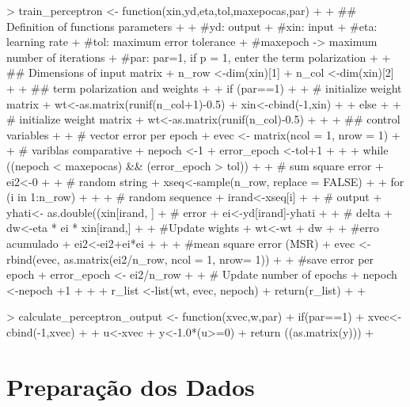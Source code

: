 \documentclass[12pt]{article}
\begin{document}
\begin{Schunk}
\begin{Sinput}
> train_perceptron <- function(xin,yd,eta,tol,maxepocas,par){
+   
+   ## Definition of  functions parameters 
+   
+   #yd: output
+   #xin: input 
+   #eta: learning rate
+   #tol: maximum error tolerance
+   #maxepoch -> maximum number of iterations
+   #par: par=1, if p = 1, enter the term polarization
+   
+   ## Dimensions of input matrix
+   n_row <-dim(xin)[1]
+   n_col <-dim(xin)[2] 
+   
+   ## term polarization and weights 
+   
+   if (par==1){
+     
+     # initialize weight matrix
+     wt<-as.matrix(runif(n_col+1)-0.5) 
+     xin<-cbind(-1,xin)
+   }
+   else{
+     
+     # initialize weight matrix
+     wt<-as.matrix(runif(n_col)-0.5)
+   }
+   
+   ## control variables 
+   
+   # vector error per epoch
+   evec <- matrix(ncol = 1, nrow = 1)
+   
+   # variblas comparative  
+   nepoch <-1
+   error_epoch <-tol+1
+   
+   
+   while ((nepoch < maxepocas) && (error_epoch > tol))
+   {
+     # sum square error
+     ei2<-0
+     
+     # random string
+     xseq<-sample(n_row, replace = FALSE)
+     
+     for (i in 1:n_row)
+     {
+       
+       # random sequence
+       irand<-xseq[i]
+       
+       # output 
+       yhati<- as.double((xin[irand, ] %*% wt) >= 0)
+       # error 
+       ei<-yd[irand]-yhati
+       
+       # delta 
+       dw<-eta * ei * xin[irand,] 
+       
+       #Update wights 
+       wt<-wt + dw
+       
+       #erro acumulado
+       ei2<-ei2+ei*ei
+     }
+     
+     #mean square error (MSR)
+     evec <- rbind(evec, as.matrix(ei2/n_row, ncol = 1, nrow= 1))
+     
+     #save error per epoch
+     error_epoch <- ei2/n_row
+     
+     # Update number of epochs 
+     nepoch <-nepoch +1
+   }
+   
+   r_list <-list(wt, evec, nepoch)
+   return(r_list)
+   
+ } 
\end{Sinput}
\end{Schunk}

\begin{Schunk}
\begin{Sinput}
>   calculate_perceptron_output <- function(xvec,w,par){
+   if(par==1){
+       xvec<-cbind(-1,xvec)}
+   
+   u<-xvec %*% w
+   y<-1.0*(u>=0)
+   return ((as.matrix(y))) 
+ }
\end{Sinput}
\end{Schunk}

\section{Preparação dos Dados}
\end{document}
